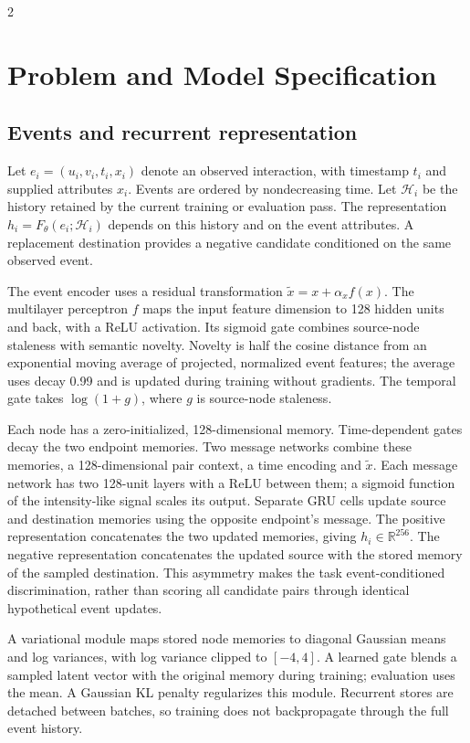 \documentclass[a4paper,10pt,fleqn]{article}
\begin{document}
\begin{multicols}{2}
\section{Problem and Model Specification}
\subsection{Events and recurrent representation}
Let $e_i=(u_i,v_i,t_i,x_i)$ denote an observed interaction, with timestamp $t_i$ and supplied attributes $x_i$. Events are ordered by nondecreasing time. Let $\mathcal H_i$ be the history retained by the current training or evaluation pass. The representation $h_i=F_\theta(e_i;\mathcal H_i)$ depends on this history and on the event attributes. A replacement destination provides a negative candidate conditioned on the same observed event.

The event encoder uses a residual transformation $\widetilde x=x+\alpha_x f(x)$. The multilayer perceptron $f$ maps the input feature dimension to 128 hidden units and back, with a ReLU activation. Its sigmoid gate combines source-node staleness with semantic novelty. Novelty is half the cosine distance from an exponential moving average of projected, normalized event features; the average uses decay 0.99 and is updated during training without gradients. The temporal gate takes $\log(1+g)$, where $g$ is source-node staleness.

Each node has a zero-initialized, 128-dimensional memory. Time-dependent gates decay the two endpoint memories. Two message networks combine these memories, a 128-dimensional pair context, a time encoding and $\widetilde x$. Each message network has two 128-unit layers with a ReLU between them; a sigmoid function of the intensity-like signal scales its output. Separate GRU cells update source and destination memories using the opposite endpoint's message. The positive representation concatenates the two updated memories, giving $h_i\in\mathbb R^{256}$. The negative representation concatenates the updated source with the stored memory of the sampled destination. This asymmetry makes the task event-conditioned discrimination, rather than scoring all candidate pairs through identical hypothetical event updates.

A variational module maps stored node memories to diagonal Gaussian means and log variances, with log variance clipped to $[-4,4]$. A learned gate blends a sampled latent vector with the original memory during training; evaluation uses the mean. A Gaussian KL penalty regularizes this module. Recurrent stores are detached between batches, so training does not backpropagate through the full event history.


\end{multicols}
\end{document}
